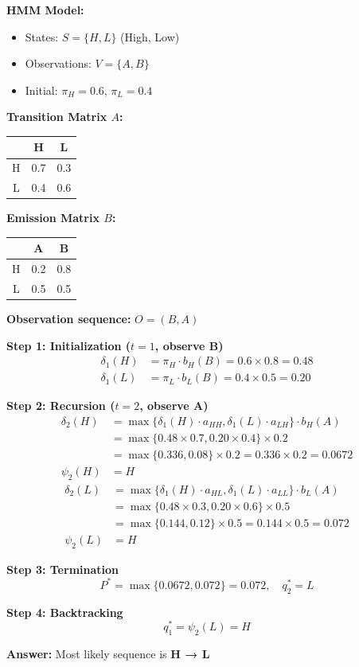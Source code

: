 \begin{examplebox}
\textbf{HMM Model:}
\begin{itemize}
    \item States: $S = \{H, L\}$ (High, Low)
    \item Observations: $V = \{A, B\}$
    \item Initial: $\pi_H = 0.6$, $\pi_L = 0.4$
\end{itemize}

\textbf{Transition Matrix $A$:}
\begin{center}
\begin{tabular}{c|cc}
& H & L \\
\hline
H & 0.7 & 0.3 \\
L & 0.4 & 0.6 \\
\end{tabular}
\end{center}

\textbf{Emission Matrix $B$:}
\begin{center}
\begin{tabular}{c|cc}
& A & B \\
\hline
H & 0.2 & 0.8 \\
L & 0.5 & 0.5 \\
\end{tabular}
\end{center}

\textbf{Observation sequence:} $O = (B, A)$

\textbf{Step 1: Initialization ($t=1$, observe B)}
\begin{align*}
\delta_1(H) &= \pi_H \cdot b_H(B) = 0.6 \times 0.8 = 0.48 \\
\delta_1(L) &= \pi_L \cdot b_L(B) = 0.4 \times 0.5 = 0.20
\end{align*}

\textbf{Step 2: Recursion ($t=2$, observe A)}
\begin{align*}
\delta_2(H) &= \max\{\delta_1(H) \cdot a_{HH}, \delta_1(L) \cdot a_{LH}\} \cdot b_H(A) \\
&= \max\{0.48 \times 0.7, 0.20 \times 0.4\} \times 0.2 \\
&= \max\{0.336, 0.08\} \times 0.2 = 0.336 \times 0.2 = \mathbf{0.0672} \\
\psi_2(H) &= H
\end{align*}
\begin{align*}
\delta_2(L) &= \max\{\delta_1(H) \cdot a_{HL}, \delta_1(L) \cdot a_{LL}\} \cdot b_L(A) \\
&= \max\{0.48 \times 0.3, 0.20 \times 0.6\} \times 0.5 \\
&= \max\{0.144, 0.12\} \times 0.5 = 0.144 \times 0.5 = \mathbf{0.072} \\
\psi_2(L) &= H
\end{align*}

\textbf{Step 3: Termination}
\[
P^* = \max\{0.0672, 0.072\} = 0.072, \quad q_2^* = L
\]

\textbf{Step 4: Backtracking}
\[
q_1^* = \psi_2(L) = H
\]

\textbf{Answer:} Most likely sequence is \textbf{H → L}
\end{examplebox}

